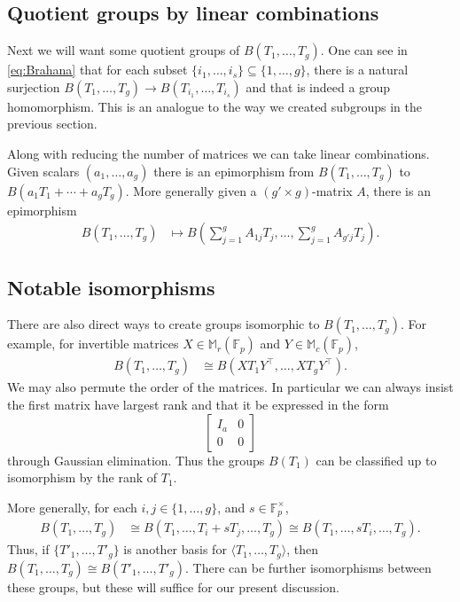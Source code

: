\documentclass{toc}
\numberwithin{equation}{section}
\theoremstyle{plain}       %
\theoremstyle{remark}
\theoremstyle{definition}
\numberwithin{figure}{section}
\numberwithin{table}{section}
\newcommand{\bbF}{\mathbb{F}}  %
\begin{document}
\subsection{Quotient groups by linear combinations}\label{sec:sub-elim}
Next we will want some quotient groups of $B(T_1,\dots, T_g)$.  One can see in
\eqref{eq:Brahana} that for each subset $\{i_1,\dots,i_s\}\subseteq
\{1,\dots,g\}$, there is a natural surjection $B(T_1,\dots,T_g)\to
B(T_{i_1},\dots,T_{i_s})$ and that is indeed a group homomorphism.  This is an
analogue to the way we created subgroups in the previous section.  

Along with reducing the number of matrices we can take linear combinations.
Given scalars $(a_1,\dots,a_g)$ there is an epimorphism from $B(T_1,\dots,T_g)$
to $B(a_1T_1+\cdots +a_g T_g)$.  More generally given a $(g'\times g)$-matrix
$A$, there is an epimorphism
\begin{align*}
	B(T_1,\dots,T_g) & \mapsto B\left(\sum_{j=1}^g A_{1j}T_j,\dots, \sum_{j=1}^g A_{g'j} T_j\right).
\end{align*}


\subsection{Notable isomorphisms}
There are also direct ways to create groups isomorphic to $B(T_1,\dots,T_g)$.
For example, for invertible matrices $X\in\mathbb{M}_r(\bbF_p)$ and
$Y\in\mathbb{M}_c(\bbF_p)$,
\begin{align*}
	B(T_1,\dots,T_g)& \cong B(XT_1Y^{\top},\dots,XT_gY^{\top}).
\end{align*}
We may also permute the order of the matrices.  In particular we can always
insist the first matrix have largest rank and that it be expressed in the form
\[
  \left[\begin{matrix} I_a & 0 \\ 0 & 0 \end{matrix}\right]
\]
through Gaussian elimination.  Thus the groups $B(T_1)$ can be
classified up to isomorphism by the rank of $T_1$.

More generally, for each $i,j\in\{1,\dots,g\}$, and $s\in \bbF_p^{\times}$,
\begin{align*}
	B(T_1,\dots,T_g)& \cong B(T_1,\dots, T_i+s T_j,\dots,T_g) \cong B(T_1,\dots,sT_i,\dots,T_g).
\end{align*}
Thus, if  $\{T'_1,\dots,T'_g\}$ is another basis for $\langle
T_1,\dots,T_g\rangle$,  then $B(T_1,\dots,T_g)\cong B(T'_1,\dots,T'_g)$.  There
can be further isomorphisms between these groups, but these will suffice for our
present discussion.  
\medskip
\end{document}
